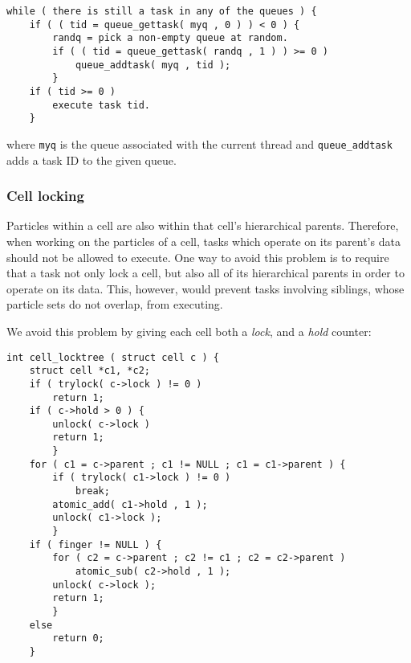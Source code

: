 \documentclass[final]{siamltex}
\begin{document}
\begin{center}\begin{minipage}{0.8\textwidth}
    \begin{lstlisting}
while ( there is still a task in any of the queues ) {
    if ( ( tid = queue_gettask( myq , 0 ) ) < 0 ) {
        randq = pick a non-empty queue at random.
        if ( ( tid = queue_gettask( randq , 1 ) ) >= 0 )
            queue_addtask( myq , tid );
        }
    if ( tid >= 0 )
        execute task tid.
    }
    \end{lstlisting}
\end{minipage}\end{center}

\noindent where {\tt myq} is the queue associated with the
current thread and {\tt queue\_addtask} adds a task ID
to the given queue.


\subsubsection{Cell locking}

Particles within a cell are also within that cell's hierarchical
parents.
Therefore, when working on the particles of a cell, tasks which
operate on its parent's data should not be allowed to execute.
One way to avoid this problem is to require that a task
not only lock a cell, but also all of its hierarchical
parents in order to operate on its data.
This, however, would prevent tasks involving siblings,
whose particle sets do not overlap, from executing.

We avoid this problem by giving each cell both a {\em lock},
and a {\em hold} counter:
        
\begin{center}\begin{minipage}{0.8\textwidth}
    \begin{lstlisting}
int cell_locktree ( struct cell c ) {
    struct cell *c1, *c2;
    if ( trylock( c->lock ) != 0 )
        return 1;
    if ( c->hold > 0 ) {
        unlock( c->lock )
        return 1;
        }
    for ( c1 = c->parent ; c1 != NULL ; c1 = c1->parent ) {
        if ( trylock( c1->lock ) != 0 )
            break;
        atomic_add( c1->hold , 1 );
        unlock( c1->lock );
        }
    if ( finger != NULL ) {
        for ( c2 = c->parent ; c2 != c1 ; c2 = c2->parent )
            atomic_sub( c2->hold , 1 );
        unlock( c->lock );
        return 1;
        }
    else
        return 0;
    }
    \end{lstlisting}
\end{minipage}\end{center}
\end{document}
